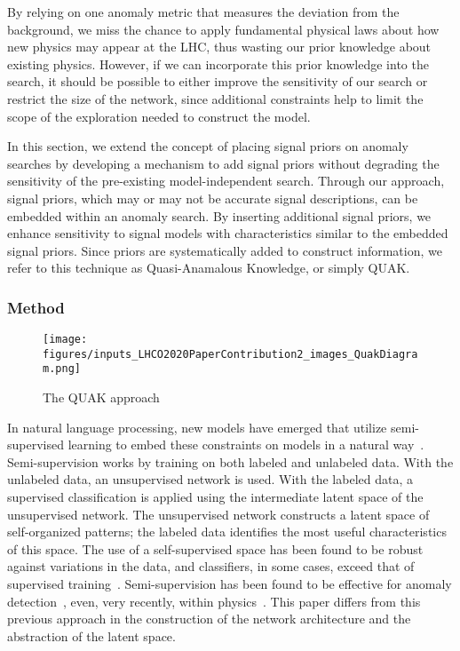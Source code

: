 \documentclass[a4paper,11pt]{article}
\begin{document}
By relying on one anomaly metric that measures the deviation from the background, we miss the chance to apply fundamental physical laws about how new physics may appear at the LHC, thus wasting our prior knowledge about existing physics. However, if we can incorporate this prior knowledge into the search, it should be possible to either improve the sensitivity of our search or restrict the size of the network, since additional constraints help to limit the scope of the exploration needed to construct the model.

In this section, we extend the concept of placing signal priors on anomaly searches by developing a mechanism to add signal priors without degrading the sensitivity of the pre-existing model-independent search. Through our approach, signal priors, which may or may not be accurate signal descriptions, can be embedded within an anomaly search. By inserting additional signal priors, we enhance sensitivity to signal models with characteristics similar to the embedded signal priors. Since priors are systematically added to construct information, we refer to this technique as Quasi-Anamalous Knowledge, or simply QUAK.












 
\subsubsection{Method}
\label{sec:method}




\begin{figure}[htbp]
\centering
\texttt{[image: figures/inputs\_LHCO2020PaperContribution2\_images\_QuakDiagram.png]}
\caption{The QUAK approach}
\label{fig:quak}
\end{figure}

In natural language processing, new models have emerged that utilize semi-supervised learning to embed these constraints on models in a natural way~\cite{chen2020big,ouali2020overview}. Semi-supervision works by training on both labeled and unlabeled data. With the unlabeled data, an unsupervised network is used. With the labeled data, a supervised classification is applied using the intermediate latent space of the unsupervised network. The unsupervised network constructs a latent space of self-organized patterns; the labeled data identifies the most useful characteristics of this space. The use of a self-supervised space has been found to be robust against variations in the data, and classifiers, in some cases, exceed that of supervised training~\cite{hendrycks2019using}. Semi-supervision has been found to be effective for anomaly detection~\cite{ruff2020deep,hendrycks2019deep}, even, very recently, within physics~\cite{Cheng:2020dal}. This paper differs from this previous approach in the construction of the network architecture and the abstraction of the latent space. 
\end{document}
